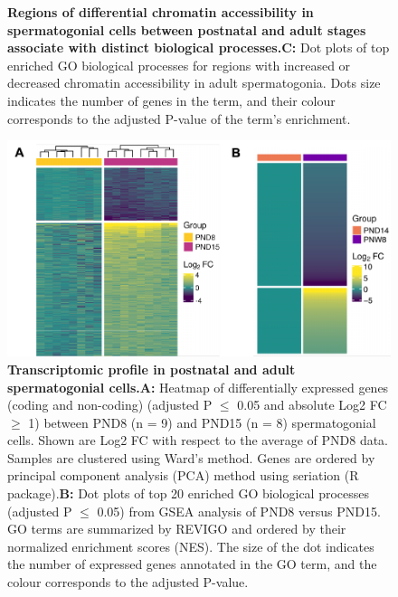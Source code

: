 \documentclass[12pt,twoside]{reedthesis}
\begin{document}
\begin{subfigures}
\begin{figure}[H]
{}

\caption[Regions of differential chromatin accessibility in spermatogonial cells between postnatal and adult stages]{\textbf{Regions of differential chromatin accessibility in spermatogonial cells between postnatal and adult stages associate with distinct biological processes.}\newline \textbf{C:} Dot plots of top enriched GO biological processes for regions with increased or decreased chromatin accessibility in adult spermatogonia. Dots size indicates the number of genes in the term, and their colour corresponds to the adjusted P-value of the term’s enrichment.}\label{fig:df1b}
\end{figure}
\end{subfigures}
\begin{subfigures}


\begin{figure}[H]

{\centering \includegraphics{thesis_files/figure-latex/df2a-1} 

}

\caption[Transcriptomic profile in postnatal and adult spermatogonial cells]{\textbf{Transcriptomic profile in postnatal and adult spermatogonial cells.}\newline \textbf{A:} Heatmap of differentially expressed genes (coding and non-coding) (adjusted P $\leq$ 0.05 and absolute Log2 FC $\geq$ 1) between PND8 (n = 9) and PND15 (n = 8) spermatogonial cells. Shown are Log2 FC with respect to the average of PND8 data. Samples are clustered using Ward’s method. Genes are ordered by principal component analysis (PCA) method using seriation (R package).\newline \textbf{B:} Dot plots of top 20 enriched GO biological processes  (adjusted P $\leq$ 0.05) from GSEA analysis of PND8 versus PND15. GO terms are summarized by REVIGO and ordered by their normalized enrichment scores (NES). The size of the dot indicates the number of expressed genes annotated in the GO term, and the colour corresponds to the adjusted P-value.}\label{fig:df2a}
\end{figure}


\end{subfigures}
\end{document}
